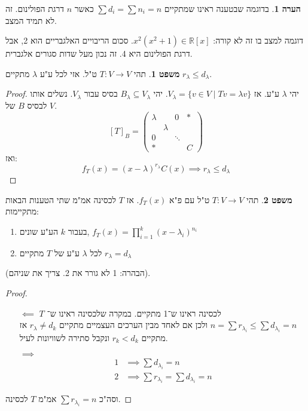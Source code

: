 \documentclass[a4paper]{article}
\newcommand\R     {\mathbb{R}}
\newcommand\F         {\mathbb{F}}
\newcommand\co        {\colon}
\newcommand\pms[1]    {\begin{pmatrix}
		#1
\end{pmatrix}}
\renewcommand\lg      {\lambda}
\theoremstyle{definition}
\newtheorem{Theorem}{משפט}
\newtheorem{Remark}{הערה}
\newcommand\theo  [1] {\begin{Theorem}#1\end{Theorem}}
\newcommand\rmark [1] {\begin{Remark}#1\end{Remark}}
\begin{document}
%		
	\rmark{בדוגמה שבטענה ראינו שמתקיים $\sum d_i = \sum n_i = n$ כאשר $n$ דרגת הפולינום. זה לא תמיד המצב. 
	
	דוגמה למצב בו זה לא קורה: $x^2(x^2 + 1) \in \R[x]$. סכום הריבויים האלגבריים הוא 2, אבל דרגת הפולינום היא 4. זה נכון מעל שדות סגורים אלגברית. }
	
	
	\theo{תהי $T \co V \to V$ ט"ל. אזי לכל ע"ע $\lg$ מתקיים $r_\lg \le d_\lg$. }
	\begin{proof}
		יהי $\lg$ ע"ע. אז $V_\lg = \{v \in V \mid Tv = \lg v\}$. יהי $B_\lg \subseteq V_\lg$ בסיס עבור $V_\lg$. נשלים אותו לבסיס $B$ של $V$. 
		\[ [T]_B = \pms{\lg & & 0 & * \\ & \lg &  & \\ 0 && \ddots & \\ *&&& C} \]
		ואז: 
		\[ f_T(x) = (x - \lg)^{r_\lg}C(x) \implies r_\lg \le d_\lg \]
	\end{proof}
	
	\theo{תהי $T \co V \to V$ ט"ל עם פ"א $f_T(x)$. אז $T$ לכסינה אמ"מ שתי הטענות הבאות מתקיימות:
		\begin{enumerate}
			\item בעבור $k$ הע"ע שונים, $f_T(x) = \prod_{i = 1}^{k}(x - \lg_i)^{n_i}$
			\item לכל $\lg$ ע"ע של $T$ מתקיים $r_\lg = d_\lg$
		\end{enumerate}
	}
	(הבהרה: 1 לא גורר את 2. צריך את שניהם). 
	
	\begin{proof}\,
		\begin{itemize}
			\item[$\impliedby$]$T$ לכסינה ראינו ש־1 מתקיים. במקרה שלכסינה ראינו ש־$n = \sum r_{\lg_i} \le \sum d_{\lg_i} = n$ ולכן אם לאחד מבין הערכים העצמיים מתקיים $r_\lg \neq d_k$ אז מתקיים $r_k < d_k$ ונקבל סתירה לשוויונות  לעיל. 
			\item[$\implies$] 
			\begin{align*}
				1 &\implies \sum d_{\lg_i} = n \\
				2 &\implies \sum r_{\lg_i} = \sum d_{\lg_i} = n
			\end{align*}
		\end{itemize}
		וסה"כ $\sum r_{\lg_i} = n$ אמ"מ $T$ לכסינה. 
	\end{proof}
	
\end{document}
